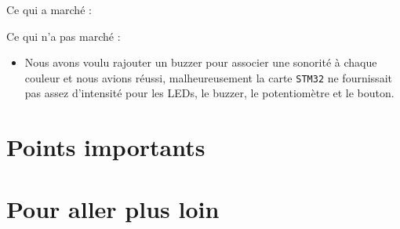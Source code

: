 \documentclass[10pt,a4,french]{article}
\begin{document}
Ce qui a marché :

\begin{itemize}
\end{itemize}

Ce qui n'a pas marché :

\begin{itemize}
	\item Nous avons voulu rajouter un buzzer pour associer une sonorité à chaque couleur et nous avions réussi,
		malheureusement la carte \texttt{STM32} ne fournissait pas assez d'intensité pour les LEDs, le buzzer, le potentiomètre et le bouton.
\end{itemize}

\section{Points importants}

\section{Pour aller plus loin}
\end{document}
